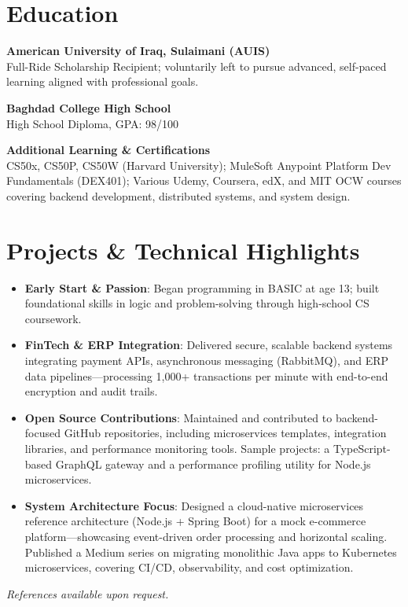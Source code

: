 \documentclass[11pt]{article}
\begin{document}
\vspace{0.2cm}
\section*{Education}
\textbf{American University of Iraq, Sulaimani (AUIS)}\\
Full-Ride Scholarship Recipient; voluntarily left to pursue advanced, self-paced learning aligned with professional goals.

\vspace{0.1cm}
\textbf{Baghdad College High School}\\
High School Diploma, GPA: 98/100

\vspace{0.1cm}
\textbf{Additional Learning \& Certifications}\\
CS50x, CS50P, CS50W (Harvard University); MuleSoft Anypoint Platform Dev Fundamentals (DEX401); Various Udemy, Coursera, edX, and MIT OCW courses covering backend development, distributed systems, and system design.

\vspace{0.2cm}
\section*{Projects \& Technical Highlights}
\begin{itemize}[leftmargin=*]\itemsep0pt
  \item \textbf{Early Start \& Passion}: Began programming in BASIC at age 13; built foundational skills in logic and problem-solving through high-school CS coursework.
  \item \textbf{FinTech \& ERP Integration}: Delivered secure, scalable backend systems integrating payment APIs, asynchronous messaging (RabbitMQ), and ERP data pipelines—processing 1,000+ transactions per minute with end-to-end encryption and audit trails.
  \item \textbf{Open Source Contributions}: Maintained and contributed to backend-focused GitHub repositories, including microservices templates, integration libraries, and performance monitoring tools. Sample projects: a TypeScript-based GraphQL gateway and a performance profiling utility for Node.js microservices.
  \item \textbf{System Architecture Focus}: Designed a cloud-native microservices reference architecture (Node.js + Spring Boot) for a mock e-commerce platform—showcasing event-driven order processing and horizontal scaling. Published a Medium series on migrating monolithic Java apps to Kubernetes microservices, covering CI/CD, observability, and cost optimization.
\end{itemize}

\vfill
\noindent\textit{References available upon request.}
\end{document}
